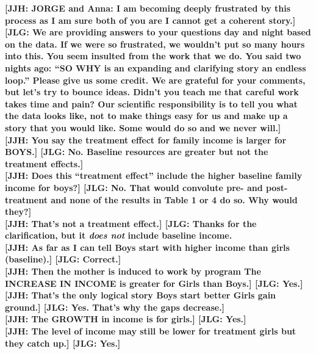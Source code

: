 \noindent \textbf{[JJH: JORGE and Anna: I am becoming deeply frustrated by this process as I am sure both of you are I cannot get a coherent story.]} \textbf{[JLG: We are providing answers to your questions day and night based on the data. If we were so frustrated, we wouldn't put so many hours into this. You seem insulted from the work that we do. You said two nights ago: ``SO WHY is an expanding and clarifying story an endless loop.'' Please give us some credit. We are grateful for your comments, but let's try to bounce ideas. Didn't you teach me that careful work takes time and pain? Our scientific responsibility is to tell you what the data looks like, not to make things easy for us and make up a story that you would like. Some would do so and we never will.]}\\

\noindent \textbf{[JJH: You say the treatment effect for family income is larger for BOYS.] [JLG: No. Baseline resources are greater but not the treatment effects.]}\\ 

\noindent \textbf{[JJH: Does this ``treatment effect'' include the higher baseline family income for boys?] [JLG: No. That would convolute pre- and post-treatment and none of the results in Table 1 or 4 do so. Why would they?]}\\

\noindent \textbf{[JJH: That's not a treatment effect.] [JLG: Thanks for the clarification, but it \textit{does not} include baseline income.} \\

\noindent \textbf{[JJH: As far as I can tell Boys start with higher income than girls (baseline).] [JLG: Correct.]}\\

\noindent \textbf{[JJH: Then the  mother is induced to work by program The INCREASE IN INCOME is greater for Girls than Boys.] [JLG: Yes.]}\\ 

\noindent \textbf{[JJH: That's the only logical story Boys start better Girls gain ground.] [JLG: Yes. That's why the gaps decrease.]}\\

\noindent \textbf{[JJH: The GROWTH in income is for girls.] [JLG: Yes.]}\\

\noindent \textbf{[JJH: The level of income may still be lower for treatment girls but they catch up.] [JLG: Yes.]}\\ 

